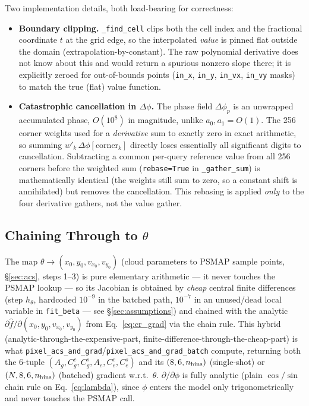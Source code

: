 \documentclass[11pt,a4paper]{article}
\newcommand{\code}[1]{\texttt{#1}}
\begin{document}
Two implementation details, both load-bearing for correctness:
\begin{itemize}
  \item \textbf{Boundary clipping.} \code{\_find\_cell} clips both the cell
    index and the fractional coordinate $t$ at the grid edge, so the
    interpolated \emph{value} is pinned flat outside the domain
    (extrapolation-by-constant). The raw polynomial derivative does not
    know about this and would return a spurious nonzero slope there; it is
    explicitly zeroed for out-of-bounds points (\code{in\_x}, \code{in\_y},
    \code{in\_vx}, \code{in\_vy} masks) to match the true (flat) value
    function.
  \item \textbf{Catastrophic cancellation in $\Delta\phi$.} The phase field
    $\Delta\phi_p$ is an unwrapped accumulated phase, $O(10^8)$ in
    magnitude, unlike $a_0,a_1=O(1)$. The 256 corner weights used for a
    \emph{derivative} sum to exactly zero in exact arithmetic, so summing
    $w'_k\,\Delta\phi[\text{corner}_k]$ directly loses essentially all
    significant digits to cancellation. Subtracting a common per-query
    reference value from all 256 corners before the weighted sum
    (\code{rebase=True} in \code{\_gather\_sum}) is mathematically
    identical (the weights still sum to zero, so a constant shift is
    annihilated) but removes the cancellation. This rebasing is applied
    \emph{only} to the four derivative gathers, not the value gather.
\end{itemize}

\subsection{Chaining Through to $\theta$}

The map $\theta \to (x_0,y_0,v_{x_0},v_{y_0})$ (cloud parameters to PSMAP
sample points, \S\ref{sec:acs}, steps 1--3) is pure elementary arithmetic
--- it never touches the PSMAP lookup --- so its Jacobian is obtained by
\emph{cheap} central finite differences (step $h_\theta$, hardcoded
$10^{-9}$ in the batched path, $10^{-7}$ in an unused/dead local variable in
\code{fit\_beta} --- see \S\ref{sec:assumptions}) and chained with the
analytic $\partial \hat f/\partial(x_0,y_0,v_{x_0},v_{y_0})$ from
Eq.~\ref{eq:cr_grad} via the chain rule. This hybrid
(analytic-through-the-expensive-part, finite-difference-through-the-cheap-part)
is what \code{pixel\_acs\_and\_grad}/\code{pixel\_acs\_and\_grad\_batch}
compute, returning both the 6-tuple $(A_g,C^c_g,C^s_g,A_e,C^c_e,C^s_e)$ and
its $(8,6,n_{\rm bins})$ (single-shot) or $(N,8,6,n_{\rm bins})$ (batched)
gradient w.r.t.\ $\theta$. $\partial/\partial\phi$ is fully analytic
(plain $\cos/\sin$ chain rule on Eq.~\ref{eq:lambda}), since $\phi$ enters
the model only trigonometrically and never touches the PSMAP call.
\end{document}
